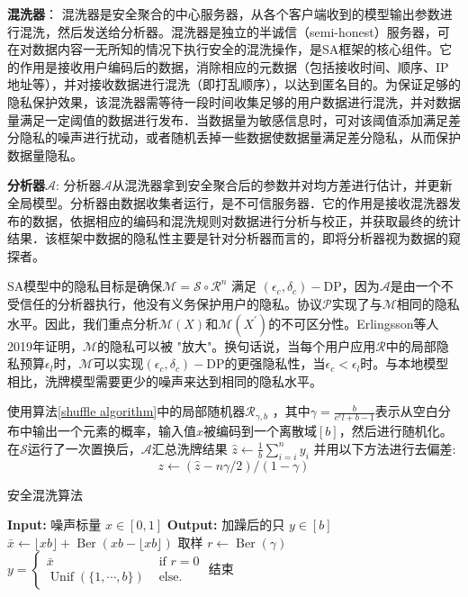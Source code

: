 \textbf{混洗器}：
混洗器是安全聚合的中心服务器，从各个客户端收到的模型输出参数进行混洗，然后发送给分析器。混洗器是独立的半诚信（semi-honest）服务器，可在对数据内容一无所知的情况下执行安全的混洗操作，是SA框架的核心组件。它的作用是接收用户编码后的数据，消除相应的元数据（包括接收时间、顺序、IP地址等），并对接收数据进行混洗（即打乱顺序），以达到匿名目的。为保证足够的隐私保护效果，该混洗器需等待一段时间收集足够的用户数据进行混洗，并对数据量满足一定阈值的数据进行发布．当数据量为敏感信息时，可对该阈值添加满足差分隐私的噪声进行扰动，或者随机丢掉一些数据使数据量满足差分隐私，从而保护数据量隐私。

\textbf{分析器$\mathcal{A}$}:
分析器$\mathcal{A}$从混洗器拿到安全聚合后的参数并对均方差进行估计，并更新全局模型。分析器由数据收集者运行，是不可信服务器．它的作用是接收混洗器发布的数据，依据相应的编码和混洗规则对数据进行分析与校正，并获取最终的统计结果．该框架中数据的隐私性主要是针对分析器而言的，即将分析器视为数据的窥探者。


SA模型中的隐私目标是确保$\mathcal{M}=\mathcal{S} \circ \mathcal{R}^{n}$ 满足 $\left(\epsilon_{c}, \delta_{c}\right)-\mathrm{DP}$，因为$\mathcal{A}$是由一个不受信任的分析器执行，他没有义务保护用户的隐私。协议$\mathcal{P}$实现了与$\mathcal{M}$相同的隐私水平。因此，我们重点分析$\mathcal{M}(X)$和$\mathcal{M}\left(X^{\prime}\right)$的不可区分性。Erlingsson等人2019年证明，$\mathcal{M}$的隐私可以被 "放大"。换句话说，当每个用户应用$\mathcal{R}$中的局部隐私预算$\epsilon_{l}$时，$\mathcal{M}$可以实现$\left(\epsilon_{c}, \delta_{c}\right)-\mathrm{DP}$的更强隐私性，当$\epsilon_{c}<\epsilon_{l}$时。与本地模型相比，洗牌模型需要更少的噪声来达到相同的隐私水平。

使用算法\ref{shuffle algorithm}中的局部随机器$\mathcal{R}_{\gamma, b}$ ，其中$\gamma=\frac{b}{e^{\epsilon} l+b-1}$表示从空白分布中输出一个元素的概率，输入值$x$被编码到一个离散域$[b]$，然后进行随机化。在$\mathcal{S}$运行了一次置换后，$\mathcal{A}$汇总洗牌结果 $\hat{z} \leftarrow \frac{1}{b} \sum_{i=i}^{n} y_{i}$ 并用以下方法进行去偏差:
\begin{equation}\label{eq:shuffle去偏差}
z \leftarrow(\hat{z}-n \gamma / 2) /(1-\gamma)
\end{equation}

\begin{algorithm}[!htb]
  \caption{安全混洗算法}
  \label{shuffle algorithm}
  \begin{algorithmic}[1]
    \footnotesize
    \STATE \textbf{Input:} 噪声标量 $x \in[0,1]$
    \STATE \textbf{Output:} 加躁后的只 $y \in[b]$
      \STATE $\bar{x} \leftarrow\lfloor x b\rfloor+\operatorname{Ber}(x b-\lfloor x b\rfloor)$
      \STATE 取样 $r \leftarrow \operatorname{Ber}(\gamma)$
      \STATE $y=\left\{\begin{array}{ll}\bar{x} & \text { if } r=0 \\ \operatorname{Unif}(\{1, \cdots, b\}) & \text { else. }\end{array}\right.$
    \STATE 结束
  \end{algorithmic}
\end{algorithm}

